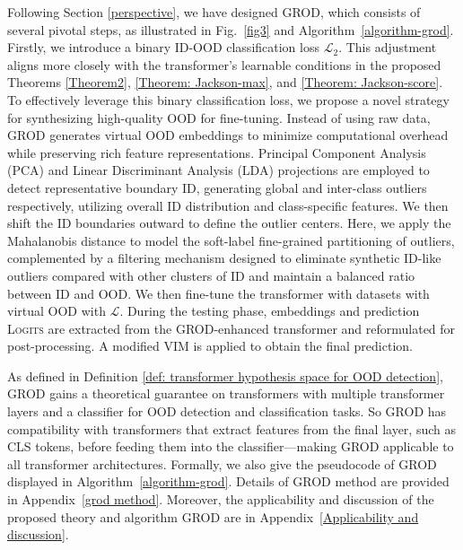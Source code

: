 \documentclass{article}
\theoremstyle{plain}
\theoremstyle{definition}
\theoremstyle{remark}
\begin{document}
Following Section \ref{perspective}, we have designed \textsc{GROD}, which consists of several pivotal steps, as illustrated in Fig.~\ref{fig3} and Algorithm~\ref{algorithm-grod}.
%
Firstly, we introduce a binary ID-OOD classification loss $\mathcal{L}_2$. This adjustment aligns more closely with the transformer's learnable conditions in the proposed Theorems \ref{Theorem2}, \ref{Theorem: Jackson-max}, and \ref{Theorem: Jackson-score}.
%
To effectively leverage this binary classification loss, we propose a novel strategy for synthesizing high-quality OOD for fine-tuning. 
Instead of using raw data, \textsc{GROD} generates virtual OOD embeddings to minimize computational overhead while preserving rich feature representations. 
%
Principal Component Analysis (PCA) and Linear Discriminant Analysis (LDA) projections are employed to detect representative boundary ID, generating global and inter-class outliers respectively, utilizing overall ID distribution and class-specific features. We then shift the ID boundaries outward to define the outlier centers.
%
Here, we apply the Mahalanobis distance to model the soft-label fine-grained partitioning of outliers, complemented by a filtering mechanism designed to eliminate synthetic ID-like outliers compared with other clusters of ID and maintain a balanced ratio between ID and OOD. 
%
We then fine-tune the transformer with datasets with virtual OOD with $\mathcal{L}$.
%
During the testing phase, embeddings and prediction \textsc{Logits} are extracted from the \textsc{GROD}-enhanced transformer and reformulated for post-processing. A modified \textsc{VIM} \citep{wang2022vim} is applied to obtain the final prediction.

As defined in Definition \ref{def: transformer hypothesis space for OOD detection}, \textsc{GROD} gains a theoretical guarantee on transformers with multiple transformer layers and a classifier for OOD detection and classification tasks. 
So \textsc{GROD} has compatibility with transformers that extract features from the final layer, such as  CLS tokens, before feeding them into the classifier---making \textsc{GROD} applicable to all transformer architectures. Formally, we also give the pseudocode of \textsc{GROD} displayed in Algorithm~\ref{algorithm-grod}.
Details of \textsc{GROD} method are provided in Appendix~\ref{grod method}. Moreover, the applicability and discussion of the proposed theory and algorithm \textsc{GROD} are in Appendix~\ref{Applicability and discussion}.
\end{document}
